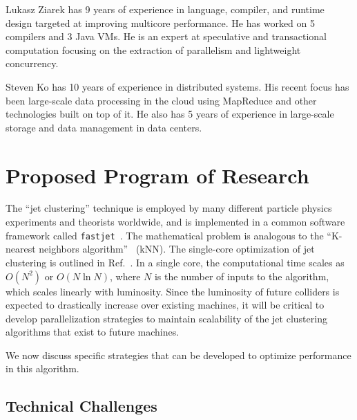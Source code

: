 \documentclass[times,11pt]{article}
\begin{document}
Lukasz Ziarek has 9 years of experience in language, compiler,
and runtime design targeted at improving multicore performance.  He
has worked on 5 compilers and 3 Java VMs. He is an expert at
speculative and transactional computation focusing on the extraction
of parallelism and lightweight concurrency. 



Steven Ko has 10 years of experience in distributed systems. His
recent focus has been large-scale data processing in the cloud using
MapReduce and other technologies built on top of it. He also has 5
years of experience in large-scale storage and data management in
data centers.


\section{Proposed Program of Research}


The
``jet clustering'' technique is employed by
many different particle physics experiments and theorists worldwide, and is
implemented in a common software framework called 
{\tt fastjet}~\cite{fastjet_manual}. 
The mathematical problem is analogous to the
``K-nearest neighbors algorithm''~\cite{knn_ieee} (kNN). 
The single-core optimization of
jet clustering
is outlined in Ref.~\cite{fastjet_timing}. In a single core,
the computational time scales as $O(N^2)$ or  $O(N \ln{N})$, where $N$
is the number of inputs to the algorithm, which scales linearly with
luminosity. Since the luminosity of future colliders is expected to
drastically increase over existing machines, it will be critical to
develop parallelization strategies to maintain scalability of the jet
clustering algorithms that exist to future machines. 


We now
discuss specific strategies that can be developed 
to optimize performance in this algorithm. 


\iffalse
There is existing work and literature on the topic of the
parallelization of similar kNN algorithms, for instance, in
Refs.~\cite{knn_gpu_1, knn_gpu_2, knn_gpu_3}, where improvements
$O(100)$ in CPU performance are observed over standard
algorithms. Since the proposed use case is
very similar to the kNN algorithm, similar improvements to the
processing time by parallelization strategies are expected. 
\fi



\subsection{Technical Challenges}
\end{document}
